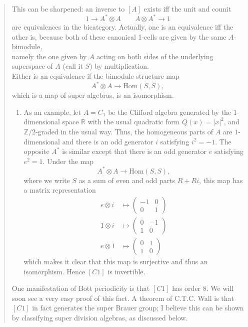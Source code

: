 \documentclass{article}
\def\tightlist{}
\begin{document}
\begin{quote}
This can be sharpened: an inverse to \([A]\) exists iff the unit and
counit \[1\to A^*\otimes A \qquad A\otimes A^*\to 1\] are equivalences
in the bicategory. Actually, one is an equivalence iff the other is,
because both of these canonical 1-cells are given by the same
\(A\)-bimodule,\\
namely the one given by \(A\) acting on both sides of the underlying
superspace of \(A\) (call it \(S\)) by multiplication.\\
Either is an equivalence if the bimodule structure map
\[A^* \otimes A \to \mathrm{Hom}(S, S),\] which is a map of super
algebras, is an isomorphism.

\begin{enumerate}
\def\labelenumi{\arabic{enumi}.}
\setcounter{enumi}{1}
\tightlist
\item
  As an example, let \(A = C_1\) be the Clifford algebra generated by
  the \(1\)-dimensional space \(\mathbb{R}\) with the usual quadratic
  form \(Q(x) = |x|^2\), and \(\mathbb{Z}/2\)-graded in the usual way.
  Thus, the homogeneous parts of \(A\) are \(1\)-dimensional and there
  is an odd generator \(i\) satisfying \(i^2 = -1\). The opposite
  \(A^*\) is similar except that there is an odd generator \(e\)
  satisfying \(e^2 = 1\). Under the map
  \[A^* \otimes A \to \mathrm{Hom}(S, S),\] where we write \(S\) as a
  sum of even and odd parts \(R + Ri\), this map has a matrix
  representation \[
    \begin{aligned}
  e\otimes i
  &\mapsto
  \left(\begin{array}{cc}-1&0\\0&1\end{array}\right)
    \\1\otimes i
  &\mapsto
  \left(\begin{array}{cc}0&-1\\1&0\end{array}\right)
    \\e\otimes 1
  &\mapsto
  \left(\begin{array}{cc}0&1\\1&0\end{array}\right)
    \end{aligned}
  \] which makes it clear that this map is surjective and thus an
  isomorphism. Hence \([C1]\) is invertible.
\end{enumerate}

One manifestation of Bott periodicity is that \([C1]\) has order 8. We
will soon see a very easy proof of this fact. A theorem of C.T.C. Wall
is that \([C1]\) in fact generates the super Brauer group; I believe
this can be shown by classifying super division algebras, as discussed
below.


\end{quote}
\end{document}
